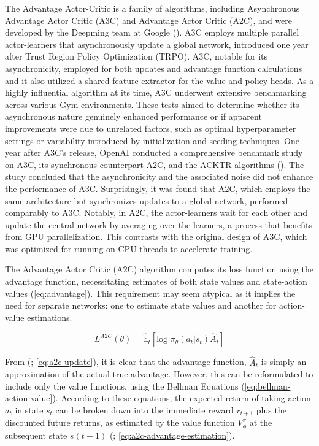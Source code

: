 \noindent The Advantage Actor-Critic is a family of algorithms, including Asynchronous Advantage Actor Critic (A3C) and Advantage Actor Critic (A2C), and were developed by the Deepming team at Google (\textcolor{deepblue}{\cite{mnih2016asynchronous}}). A3C employs multiple parallel actor-learners that asynchronously update a global network, introduced one year after Trust Region Policy Optimization (TRPO). A3C, notable for its asynchronicity, employed  for both updates and advantage function calculations and it also utilized a shared feature extractor for the value and policy heads. As a highly influential algorithm at its time, A3C underwent extensive benchmarking across various Gym environments. These tests aimed to determine whether its asynchronous nature genuinely enhanced performance or if apparent improvements were due to unrelated factors, such as optimal hyperparameter settings or variability introduced by initialization and seeding techniques. One year after A3C's release, OpenAI conducted a comprehensive benchmark study on A3C, its synchronous counterpart A2C, and the ACKTR algorithms (\textcolor{deepblue}{\cite{wu2017scalable}}). The study concluded that the asynchronicity and the associated noise did not enhance the performance of A3C. Surprisingly, it was found that A2C, which employs the same architecture but synchronizes  updates to a global network, performed comparably to A3C. Notably, in A2C, the actor-learners wait for each other and update the central network by averaging over the learners, a process that benefits from GPU parallelization. This contrasts with the original design of A3C, which was optimized for running on CPU threads to accelerate training.

\bigskip

\noindent The Advantage Actor Critic (A2C) algorithm computes its loss function using the advantage function, necessitating estimates of both state values and state-action values (\textcolor{deepblue}{\autoref{eq:advantage}}). This requirement may seem atypical as it implies the need for separate networks: one to estimate state values and another for action-value estimations. 

\begin{equation}
    L^{A2C}(\theta) = \mathbb{\hat{E}}_{t} \left [ \text{log } \pi_{\theta}(a_t | s_t) \hat{A}_t \right]
    \label{eq:a2c-update}
\end{equation}

\noindent From (\textcolor{deepblue}{\cite{mnih2016asynchronous}; \autoref{eq:a2c-update}}), it is clear that the advantage function, $\hat{A}_t$ is simply an approximation of the actual true advantage. However, this can be reformulated to include only the value functions, using the Bellman Equations (\textcolor{deepblue}{\autoref{eq:bellman-action-value}}). According to these equations, the expected return of taking action $a_t$ in state $s_t$ can be broken down into the immediate reward $r_{t+1}$ plus the discounted future returns, as estimated by the value function $V^{\pi}_{\phi}$ at the subsequent state $s(t+1)$ (\textcolor{deepblue}{\cite{mnih2016asynchronous}; \autoref{eq:a2c-advantage-estimation}}). 

